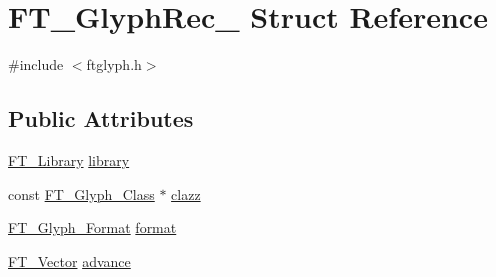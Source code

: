 \hypertarget{struct_f_t___glyph_rec__}{\section{F\-T\-\_\-\-Glyph\-Rec\-\_\- Struct Reference}
\label{struct_f_t___glyph_rec__}
}


{\ttfamily \#include $<$ftglyph.\-h$>$}

\subsection*{Public Attributes}
\begin{DoxyCompactItemize}
\item 
\hyperlink{freetype_8h_a92857f8bf079b7b9ef5d3ce74cf89ef5}{F\-T\-\_\-\-Library} \hyperlink{struct_f_t___glyph_rec___a00679b5e2519affab0f3999718817f8e}{library}
\item 
const \hyperlink{ftglyph_8h_ad05b3999d93247f41f1c4ac20ea0104b}{F\-T\-\_\-\-Glyph\-\_\-\-Class} $\ast$ \hyperlink{struct_f_t___glyph_rec___ad7074cfe0e9fd6616e4dc4011e481524}{clazz}
\item 
\hyperlink{ftimage_8h_aeca0d10a27aedecbf96515e0628aff1f}{F\-T\-\_\-\-Glyph\-\_\-\-Format} \hyperlink{struct_f_t___glyph_rec___a26b42a2610a69dcaed3e7c8b6d506211}{format}
\item 
\hyperlink{ftimage_8h_ab158b5a7e422acb1968af95db786d018}{F\-T\-\_\-\-Vector} \hyperlink{struct_f_t___glyph_rec___afd95b047df6a249db79018a279137018}{advance}
\end{DoxyCompactItemize}



